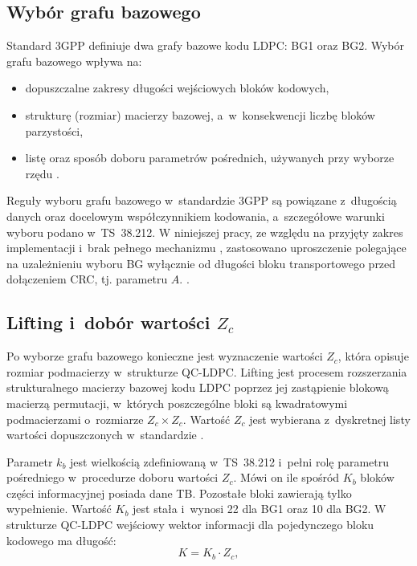 \subsection{Wybór grafu bazowego}
Standard 3GPP definiuje dwa grafy bazowe kodu LDPC: BG1 oraz BG2. Wybór grafu bazowego wpływa na:
\begin{itemize}
  \item dopuszczalne zakresy długości wejściowych bloków kodowych,
  \item strukturę (rozmiar) macierzy bazowej, a~w~konsekwencji liczbę bloków parzystości,
  \item listę oraz sposób doboru parametrów pośrednich, używanych przy wyborze rzędu .
\end{itemize}
Reguły wyboru grafu bazowego w~standardzie 3GPP są powiązane z~długością danych oraz docelowym współczynnikiem kodowania, a~szczegółowe warunki wyboru podano w~TS~38.212. W niniejszej pracy, ze względu na przyjęty zakres implementacji i~brak pełnego mechanizmu , zastosowano uproszczenie polegające na uzależnieniu wyboru BG wyłącznie od długości bloku transportowego przed dołączeniem CRC, tj. parametru $A$. \cite{bib:3gpp_38212}.

\subsection{Lifting i~dobór wartości $Z_c$}
Po wyborze grafu bazowego konieczne jest wyznaczenie wartości $Z_c$, która opisuje rozmiar podmacierzy w~strukturze QC-LDPC. Lifting jest procesem rozszerzania strukturalnego macierzy bazowej kodu LDPC poprzez jej zastąpienie blokową macierzą permutacji, w~których poszczególne bloki są kwadratowymi podmacierzami o~rozmiarze $Z_c \times Z_c$. Wartość $Z_c$ jest wybierana z~dyskretnej listy wartości dopuszczonych w~standardzie \cite{bib:3gpp_38212}.

Parametr $k_b$ jest wielkością zdefiniowaną w~TS~38.212 i~pełni rolę parametru pośredniego w~procedurze doboru wartości $Z_c$. Mówi on ile spośród $K_b$ bloków części informacyjnej posiada dane TB. Pozostałe bloki zawierają tylko wypełnienie. Wartość $K_b$ jest stała i~wynosi 22 dla BG1 oraz 10 dla BG2. W strukturze QC-LDPC wejściowy wektor informacji dla pojedynczego bloku kodowego ma długość:
\begin{equation}
K = K_b \cdot Z_c,
\label{eq:K_kbZc}
\end{equation}

